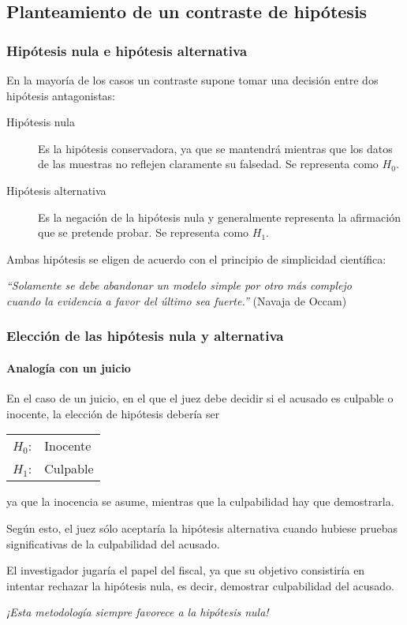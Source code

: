 \subsection{Planteamiento de un contraste de hipótesis}
\begin{frame}
\frametitle{Hipótesis nula e hipótesis alternativa}
En la mayoría de los casos un contraste supone tomar una decisión entre dos hipótesis antagonistas:
\begin{description}
\item[Hipótesis nula] Es la hipótesis conservadora, ya que se mantendrá mientras que los datos de las muestras
no reflejen claramente su falsedad. Se representa como $H_0$.
\item[Hipótesis alternativa] Es la negación de la hipótesis nula y generalmente representa la afirmación que se
pretende probar. Se representa como $H_1$.
\end{description}

Ambas hipótesis se eligen de acuerdo con el principio de simplicidad científica: 
\begin{center}
\emph{``Solamente se debe abandonar un modelo simple por otro más complejo\\
cuando la evidencia a favor del último sea fuerte.''} (Navaja de Occam)
\end{center}
\end{frame}


\begin{frame}
\frametitle{Elección de las hipótesis nula y alternativa}
\framesubtitle{Analogía con un juicio}
En el caso de un juicio, en el que el juez debe decidir si el acusado es culpable o inocente, la elección de hipótesis debería ser
\begin{center} 
\begin{tabular}{ll}
$H_0$: & Inocente\\
$H_1$: & Culpable
\end{tabular}
\end{center}
ya que la inocencia se asume, mientras que la culpabilidad hay que demostrarla.

Según esto, el juez sólo aceptaría la hipótesis alternativa cuando hubiese pruebas significativas de la culpabilidad del
acusado.

El investigador jugaría el papel del fiscal, ya que su objetivo consistiría en intentar rechazar la hipótesis
nula, es decir, demostrar culpabilidad del acusado.

\begin{center}
\emph{¡Esta metodología siempre favorece a la hipótesis nula!}
\end{center}
\end{frame}


